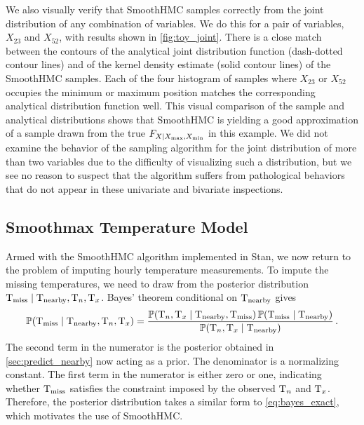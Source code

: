\documentclass[12pt]{article}
\begin{document}
We also visually verify that SmoothHMC samples correctly from the joint distribution of any combination of variables.
We do this for a pair of variables, \(X_{23}\) and \(X_{52}\), with results shown in \autoref{fig:toy_joint}.
There is a close match between the contours of the analytical joint distribution function (dash-dotted contour lines) and of the kernel density estimate (solid contour lines) of the SmoothHMC samples.
Each of the four histogram of samples where \(X_{23}\) or \(X_{52}\) occupies the minimum or maximum position matches the corresponding analytical distribution function well.
This visual comparison of the sample and analytical distributions shows that SmoothHMC is yielding a good approximation of a sample drawn from the true \(F_{X \mid X_{\max},X_{\min}}\) in this example.
We did not examine the behavior of the sampling algorithm for the joint distribution of more than two variables due to the difficulty of visualizing such a distribution,
but we see no reason to suspect that the algorithm suffers from pathological behaviors that do not appear in these univariate and bivariate inspections.

\subsection{Smoothmax Temperature Model}

Armed with the SmoothHMC algorithm implemented in Stan, we now return to the problem of imputing hourly temperature measurements.
To impute the missing temperatures, we need to draw from the posterior distribution \(\mathrm{T}_{\mathrm{miss}} \mid \mathrm{T}_{\mathrm{nearby}}, \mathrm{T}_{n}, \mathrm{T}_{x}\).
Bayes' theorem conditional on \(\mathrm{T}_{\mathrm{nearby}}\) gives
\begin{equation}
    \Pr\del{\T_\miss \mid \T_\obs, \Tn, \Tx} = \frac{
        \Pr\del{\Tn, \Tx \mid \T_\obs, \T_\miss } 
        \Pr\del{\T_\miss \mid \T_\obs}
        }{
        \Pr\del{\Tn, \Tx \mid \T_\obs}
        }\,.
\end{equation}
The second term in the numerator is the posterior obtained in \autoref{sec:predict_nearby} now acting as a prior.
The denominator is a normalizing constant.
The first term in the numerator is either zero or one, indicating whether \(\mathrm{T}_{\mathrm{miss}}\) satisfies the constraint imposed by the observed \(\mathrm{T}_{n}\) and \(\mathrm{T}_{x}\).
Therefore, the posterior distribution takes a similar form to \autoref{eq:bayes_exact}, which motivates the use of SmoothHMC.
\end{document}

